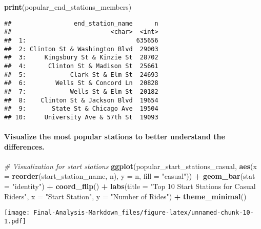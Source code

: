 \documentclass[
]{article}
\newenvironment{Shaded}{\begin{snugshade}}{\end{snugshade}}
\newcommand{\AttributeTok}[1]{\textcolor[rgb]{0.13,0.29,0.53}{#1}}
\newcommand{\CommentTok}[1]{\textcolor[rgb]{0.56,0.35,0.01}{\textit{#1}}}
\newcommand{\FunctionTok}[1]{\textcolor[rgb]{0.13,0.29,0.53}{\textbf{#1}}}
\newcommand{\NormalTok}[1]{#1}
\newcommand{\SpecialCharTok}[1]{\textcolor[rgb]{0.81,0.36,0.00}{\textbf{#1}}}
\newcommand{\StringTok}[1]{\textcolor[rgb]{0.31,0.60,0.02}{#1}}
\begin{document}
\begin{Shaded}
\begin{Highlighting}[]
\FunctionTok{print}\NormalTok{(popular\_end\_stations\_members)}
\end{Highlighting}
\end{Shaded}

\begin{verbatim}
##                 end_station_name      n
##                           <char>  <int>
##  1:                              635656
##  2: Clinton St & Washington Blvd  29003
##  3:     Kingsbury St & Kinzie St  28702
##  4:      Clinton St & Madison St  25661
##  5:            Clark St & Elm St  24693
##  6:        Wells St & Concord Ln  20828
##  7:            Wells St & Elm St  20182
##  8:    Clinton St & Jackson Blvd  19654
##  9:       State St & Chicago Ave  19504
## 10:     University Ave & 57th St  19093
\end{verbatim}

\paragraph{Visualize the most popular stations to better understand the
differences.}\label{visualize-the-most-popular-stations-to-better-understand-the-differences.}

\begin{Shaded}
\begin{Highlighting}[]
\CommentTok{\# Visualization for start stations}
\FunctionTok{ggplot}\NormalTok{(popular\_start\_stations\_casual, }\FunctionTok{aes}\NormalTok{(}\AttributeTok{x =} \FunctionTok{reorder}\NormalTok{(start\_station\_name, n), }\AttributeTok{y =}\NormalTok{ n, }\AttributeTok{fill =} \StringTok{"casual"}\NormalTok{)) }\SpecialCharTok{+}
  \FunctionTok{geom\_bar}\NormalTok{(}\AttributeTok{stat =} \StringTok{"identity"}\NormalTok{) }\SpecialCharTok{+}
  \FunctionTok{coord\_flip}\NormalTok{() }\SpecialCharTok{+}
  \FunctionTok{labs}\NormalTok{(}\AttributeTok{title =} \StringTok{"Top 10 Start Stations for Casual Riders"}\NormalTok{, }\AttributeTok{x =} \StringTok{"Start Station"}\NormalTok{, }\AttributeTok{y =} \StringTok{"Number of Rides"}\NormalTok{) }\SpecialCharTok{+}
  \FunctionTok{theme\_minimal}\NormalTok{()}
\end{Highlighting}
\end{Shaded}

\texttt{[image: Final-Analysis-Markdown\_files/figure-latex/unnamed-chunk-10-1.pdf]}
\end{document}
